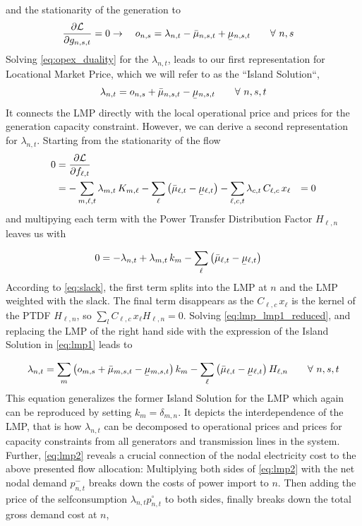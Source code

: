 \documentclass[11pt]{article}
\newcommand{\ubar}[1]{\underaccent{\bar}{#1}}
\newcommand{\generation}[1][n]{g_{#1,s,t}}
\newcommand{\opexGeneration}[1][n]{o_{#1,s}}
\newcommand{\incidence}[1][n]{K_{#1,\ell}}
\newcommand{\ptdf}[1][n]{H_{\ell,#1}}
\newcommand{\slack}[1][n]{k_{#1}}
\newcommand{\mulowergeneration}[1][n]{\ubar{\mu}_{#1,s,t}}
\newcommand{\muuppergeneration}[1][n]{\bar{\mu}_{#1,s,t}}
\newcommand{\mulowerflow}{\ubar{\mu}_{\ell,t}}
\newcommand{\muupperflow}{\bar{\mu}_{\ell,t}}
\newcommand{\lmp}[1][n]{\lambda_{#1,t}}
\newcommand{\flow}{f_{\ell,t}}
\newcommand{\cycle}{C_{\ell,c}}
\newcommand{\impedance}{x_\ell}
\newcommand{\cycleprice}{\lambda_{c,t}}
\newcommand{\netconsumption}[1][n]{p^{-}_{#1,t}}
\newcommand{\selfconsumption}[1][n]{p^{\circ}_{#1,t}}
\newcommand{\lagrangian}{\mathcal{L}}
\newcommand{\Forall}[1]{\hspace{20pt} \forall \,\, #1 }
\newcommand{\pdv}[2]{\frac{\partial #1}{\partial #2}}
\begin{document}
and the stationarity of the generation to 
\begin{align}
 \pdv{\lagrangian}{\generation} &= 0 
 \rightarrow \hspace{10pt}  \opexGeneration =  \lmp - \muuppergeneration + \mulowergeneration \Forall{n,s} \label{eq:opex_duality}
\end{align}
Solving \cref{eq:opex_duality} for the $\lmp$, leads to our first representation for Locational Market Price, which we will refer to as the ``Island Solution``,
\begin{align}
\lmp  =  \opexGeneration + \muuppergeneration - \mulowergeneration \Forall{n,s,t}
\label{eq:lmp1}
\end{align}
It connects the LMP directly with the local operational price and prices for the generation capacity constraint. However, we can derive a second representation for $\lmp$. Starting from the stationarity of the flow
\begin{align}
 0 &= \pdv{\lagrangian}{\flow}  \\
 &= - \sum_{m,\ell,t} \lmp[m] \, \incidence[m]  - \sum_{\ell} \left( \muupperflow - \mulowerflow \right)  - \sum_{\ell,c,t} \cycleprice \, \cycle \, \impedance &= 0
\end{align}
and multipying each term with the Power Transfer Distribution Factor $\ptdf$ leaves us with  

\begin{align}
  0 &= - \lmp + \lmp[m] \, \slack[m]  - \sum_{\ell} \left( \muupperflow - \mulowerflow \right)
  \label{eq:lmp_lmp1_reduced}
\end{align}
According to \cref{eq:slack}, the first term splits into the LMP at $n$ and the LMP weighted with the slack. The final term disappears as the $\cycle \, \impedance$ is the kernel of the PTDF $\ptdf$, so $\sum_l \cycle \, \impedance \ptdf = 0$. Solving \cref{eq:lmp_lmp1_reduced}, and replacing the LMP of the right hand side with the expression of the Island Solution in \cref{eq:lmp1} leads to 

\begin{align}
\lmp =  \sum_m \left( \opexGeneration[m] + \muuppergeneration[m] - \mulowergeneration[m] \right) \slack[m] - \sum_\ell \left( \muupperflow - \mulowerflow\right) \ptdf  \Forall{n,s,t} 
\label{eq:lmp2}
\end{align}
This equation generalizes the former Island Solution for the LMP which again can be reproduced by setting $\slack[m] = \delta_{m,n}$. It depicts the interdependence of the LMP, that is how $\lmp$ can be decomposed to operational prices and prices for capacity constraints from all generators and transmission lines in the system. 
Further, \cref{eq:lmp2} reveals a crucial connection of the nodal electricity cost to the above presented flow allocation:
Multiplying both sides of \cref{eq:lmp2}  with the net nodal demand $\netconsumption$
breaks down the costs of power import to $n$. Then adding the price of the selfconsumption $\lmp \selfconsumption$ to both sides, finally breaks down the total gross demand cost at $n$,
\end{document}
